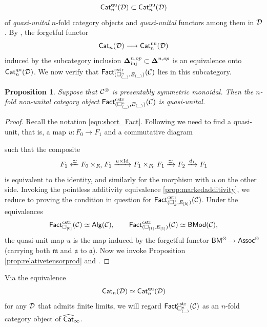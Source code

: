 \documentclass[10pt, reqno, twoside
, final
]{amsart}
\numberwithin{equation}{subsection}%
\theoremstyle{definition}
\theoremstyle{definition}
\theoremstyle{definition}
\theoremstyle{definition}
\theoremstyle{definition}
\theoremstyle{definition}
\theoremstyle{definition}
\theoremstyle{definition}
\theoremstyle{definition}
\theoremstyle{plain}
\theoremstyle{definition}
\theoremstyle{plain}
\theoremstyle{definition}
\theoremstyle{plain}
\theoremstyle{definition}
\theoremstyle{definition}
\theoremstyle{plain}
\theoremstyle{plain}
\theoremstyle{definition}
\theoremstyle{plain}
\theoremstyle{plain}
\newtheorem{prop}[defn]{Proposition}
\theoremstyle{plain}
\begin{document}
\[ \mathsf{Cat}_n^{\mathrm{qu}}(\mathcal{D})\subset \mathsf{Cat}_n^{\mathrm{nu}}(\mathcal{D}) \]
of \emph{quasi-unital} $n$-fold category objects and \emph{quasi-unital} functors among them in $\mathcal{D}$. By \cite[Corollary 4.15]{Haugseng_quasi}, the forgetful functor 
\[ \mathsf{Cat}_n(\mathcal{D})\longrightarrow \mathsf{Cat}_n^{\mathrm{nu}}(\mathcal{D}) \]
induced by the subcategory inclusion $\boldsymbol{\Delta}^{n,op}_{\mathrm{inj}}\subset \boldsymbol{\Delta}^{n,op}$ is an equivalence onto $\mathsf{Cat}_n^{\mathrm{qu}}(\mathcal{D})$. We now verify that $\mathsf{Fact}^{\mathrm{cstr}}_{(\square^n_{(\_)},E_{(\_)}) }(\mathcal{C})$ lies in this subcategory.
\begin{prop}\label{prop:moritaquasiunit}
Suppose that $\mathcal{C}^{\otimes}$ is presentably symmetric monoidal.
Then the $n$-fold non-unital category object $\mathsf{Fact}^{\mathrm{cstr}}_{(\square^n_{(\_)},E_{(\_)}) }(\mathcal{C})$ is quasi-unital.
\end{prop}
\begin{proof}
Recall the notation \eqref{eqn:short_Fact}.
Following \cite{Haugseng_quasi}
we need to find a quasi-unit, that is, a map $u\colon F_0 \to F_1$ and a commutative diagram
\begin{center}
\end{center}
such that the composite
\[ F_1 \xleftarrow{\simeq} F_0\times_{F_0} F_1 \xrightarrow{u\times \text{Id}} F_1\times_{F_0} F_1 \xrightarrow{\simeq} F_2 \xrightarrow{d_1} F_1\]
is equivalent to the identity, and similarly for the morphism with $u$ on the other side. Invoking the pointless additivity equivalence \ref{prop:markedadditivity}, we reduce to proving the condition in question for $ \mathsf{Fact}^{\mathrm{cstr}}_{(\square^1_{k},E_{[k]})}(\mathcal{C})$. Under the equivalences
\[ \mathsf{Fact}_{\square_{[0]}}^{\mathrm{cstr}}(\mathcal{C})\simeq \mathsf{Alg}(\mathcal{C}),\quad\quad \mathsf{Fact}_{(\square_{[1]},E_{[1]})}^{\mathrm{cstr}}(\mathcal{C})\simeq \mathsf{BMod}(\mathcal{C}), \]
the quasi-unit map $u$ is the map induced by the forgetful functor $\mathsf{BM}^{\otimes}\rightarrow \mathsf{Assoc}^{\otimes}$ (carrying both $\mathfrak{m}$ and $\mathfrak{a}$ to $\mathfrak{a}$). Now we invoke Proposition \ref{prop:relativetensorprod} and \cite[Proposition 4.4.3.16]{LurHA}.
\end{proof}
Via the equivalence
\[ \mathsf{Cat}_n(\mathcal{D}) \simeq \mathsf{Cat}^{\mathrm{qu}}_n(\mathcal{D})  \]
for any \infcat $\mathcal{D}$ that admits finite limits, we will regard $\mathsf{Fact}^{\mathrm{cstr}}_{\square_{(\_)}^n}(\mathcal{C})$ as an $n$-fold category object of $\widehat{\mathsf{Cat}}_{\infty}$. 
\end{document}

